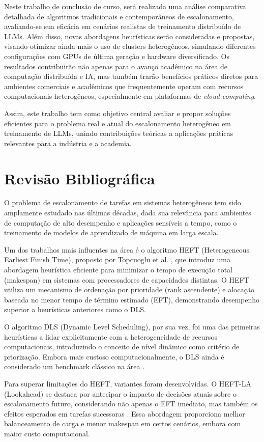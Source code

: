 \documentclass[12pt, %
openright, 
oneside, %
a4paper,    %
brazil]{facom-ufu-abntex2}
\begin{document}
Neste trabalho de conclusão de curso, será realizada uma análise comparativa detalhada de algoritmos tradicionais e contemporâneos de escalonamento, avaliando-se sua eficácia em cenários realistas de treinamento distribuído de LLMs. Além disso, novas abordagens heurísticas serão consideradas e propostas, visando otimizar ainda mais o uso de clusters heterogêneos, simulando diferentes configurações com GPUs de última geração e hardware diversificado. Os resultados contribuirão não apenas para o avanço acadêmico na área de computação distribuída e IA, mas também trarão benefícios práticos diretos para ambientes comerciais e acadêmicos que frequentemente operam com recursos computacionais heterogêneos, especialmente em plataformas de \textit{cloud computing}.

Assim, este trabalho tem como objetivo central avaliar e propor soluções eficientes para o problema real e atual do escalonamento heterogêneo em treinamento de LLMs, unindo contribuições teóricas a aplicações práticas relevantes para a indústria e a academia.

\chapter{Revisão Bibliográfica}
O problema de escalonamento de tarefas em sistemas heterogêneos tem sido amplamente estudado nas últimas décadas, dada sua relevância para ambientes de computação de alto desempenho e aplicações sensíveis a tempo, como o treinamento de modelos de aprendizado de máquina em larga escala.

Um dos trabalhos mais influentes na área é o algoritmo HEFT (Heterogeneous Earliest Finish Time), proposto por Topcuoglu et al. \cite{topcuoglu2002performance}, que introduz uma abordagem heurística eficiente para minimizar o tempo de execução total (makespan) em sistemas com processadores de capacidades distintas. O HEFT utiliza um mecanismo de ordenação por prioridade (rank ascendente) e alocação baseada no menor tempo de término estimado (EFT), demonstrando desempenho superior a heurísticas anteriores como o DLS.

O algoritmo DLS (Dynamic Level Scheduling), por sua vez, foi uma das primeiras heurísticas a lidar explicitamente com a heterogeneidade de recursos computacionais, introduzindo o conceito de nível dinâmico como critério de priorização. Embora mais custoso computacionalmente, o DLS ainda é considerado um benchmark clássico na área \cite{hagras2003static}.

Para superar limitações do HEFT, variantes foram desenvolvidas. O HEFT-LA (Lookahead) se destaca por antecipar o impacto de decisões atuais sobre o escalonamento futuro, considerando não apenas o EFT imediato, mas também os efeitos esperados em tarefas sucessoras \cite{bittencourt2010dag}. Essa abordagem proporciona melhor balanceamento de carga e menor makespan em certos cenários, embora com maior custo computacional.
\end{document}
